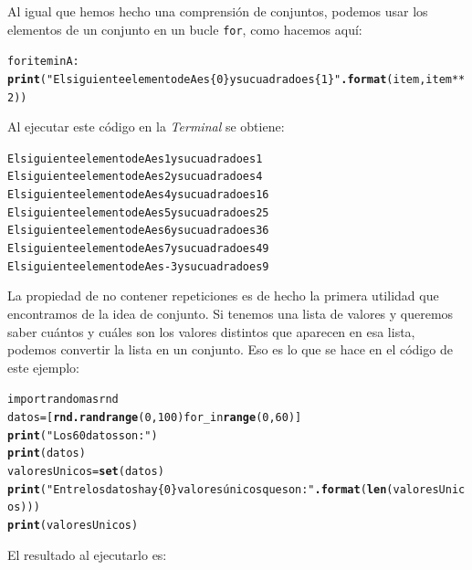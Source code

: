 \documentclass[10pt,a4paper]{article}\usepackage[]{graphicx}\usepackage[]{color}
\makeatletter
\newcommand{\hlstr}[1]{\textcolor[rgb]{0.192,0.494,0.8}{#1}}%
\newcommand{\hlkwd}[1]{\textcolor[rgb]{0.737,0.353,0.396}{\textbf{#1}}}%
\newenvironment{kframe}{%
 \def\at@end@of@kframe{}%
 \ifinner\ifhmode%
  \def\at@end@of@kframe{\end{minipage}}%
  \begin{minipage}{\columnwidth}%
 \fi\fi%
 \def\FrameCommand##1{\hskip\@totalleftmargin \hskip-\fboxsep
 \colorbox{shadecolor}{##1}\hskip-\fboxsep
     \hskip-\linewidth \hskip-\@totalleftmargin \hskip\columnwidth}%
 \MakeFramed {\advance\hsize-\width
   \@totalleftmargin\z@ \linewidth\hsize
   \@setminipage}}%
 {\par\unskip\endMakeFramed%
 \at@end@of@kframe}
\newenvironment{knitrout}{}{} %
\newcounter {cont01}
\makeatother
\begin{document}
Al igual que hemos hecho una {\sf comprensión de conjuntos}, podemos usar los elementos de un conjunto en un bucle {\tt for}, como hacemos aquí:
\begin{knitrout}
\color{fgcolor}\begin{kframe}
\begin{alltt}
for item in A:
  \hlkwd{print}(\hlstr{"El siguiente elemento de A es \{0\} y su cuadrado es \{1\}"}\hlkwd{.format}(item, item**2))
\end{alltt}
\end{kframe}
\end{knitrout}
Al ejecutar este código en la {\em Terminal} se obtiene:
\begin{knitrout}
\color{fgcolor}\begin{kframe}
\begin{alltt}
El siguiente elemento de A es 1 y su cuadrado es 1
El siguiente elemento de A es 2 y su cuadrado es 4
El siguiente elemento de A es 4 y su cuadrado es 16
El siguiente elemento de A es 5 y su cuadrado es 25
El siguiente elemento de A es 6 y su cuadrado es 36
El siguiente elemento de A es 7 y su cuadrado es 49
El siguiente elemento de A es -3 y su cuadrado es 9
\end{alltt}
\end{kframe}
\end{knitrout}
La propiedad de no contener repeticiones es de hecho la primera utilidad que encontramos de la idea de conjunto. Si tenemos una lista de valores y queremos saber cuántos y cuáles son los valores distintos que aparecen en esa lista, podemos convertir la lista en un conjunto. Eso es lo que se hace en el código de este ejemplo:
\begin{knitrout}
\color{fgcolor}\begin{kframe}
\begin{alltt}
import random as rnd
datos = [\hlkwd{rnd.randrange}(0, 100) for _ in \hlkwd{range}(0, 60)]
\hlkwd{print}(\hlstr{"Los 60 datos son:"} )
\hlkwd{print}(datos)
valoresUnicos = \hlkwd{set}(datos)
\hlkwd{print}(\hlstr{"Entre los datos hay \{0\} valores únicos que son:"}\hlkwd{.format}(\hlkwd{len}(valoresUnicos)))
\hlkwd{print}(valoresUnicos)
\end{alltt}
\end{kframe}
\end{knitrout}
El resultado al ejecutarlo es:
\end{document}
